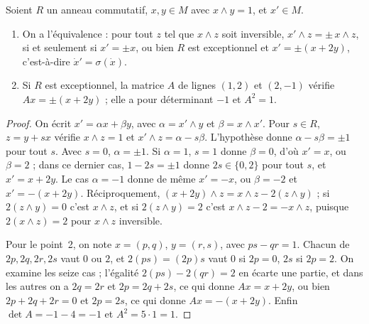 \begin{enonce}
Soient $R$ un anneau commutatif, $x, y \in M$ avec $x \wedge y = 1$, et $x' \in M$.
\begin{enumerate}
\item On a l'équivalence : pour tout $z$ tel que $x \wedge z$ soit inversible, $x' \wedge z = \pm\, x \wedge z$, si et seulement si $x' = \pm x$, ou bien $R$ est exceptionnel et $x' = \pm(x + 2y)$, c'est-à-dire $\dot x' = \sigma(\dot x)$.
\item Si $R$ est exceptionnel, la matrice $A$ de lignes $(1, 2)$ et $(2, -1)$ vérifie $Ax = \pm(x + 2y)$ ; elle a pour déterminant $-1$ et $A^2 = 1$.
\end{enumerate}
\end{enonce}

\begin{proof}
On écrit $x' = \alpha x + \beta y$, avec $\alpha = x' \wedge y$ et $\beta = x \wedge x'$. Pour $s \in R$, $z = y + sx$ vérifie $x \wedge z = 1$ et $x' \wedge z = \alpha - s\beta$. L'hypothèse donne $\alpha - s\beta = \pm 1$ pour tout $s$. Avec $s = 0$, $\alpha = \pm 1$. Si $\alpha = 1$, $s = 1$ donne $\beta = 0$, d'où $x' = x$, ou $\beta = 2$ ; dans ce dernier cas, $1 - 2s = \pm 1$ donne $2s \in \{0, 2\}$ pour tout $s$, et $x' = x + 2y$. Le cas $\alpha = -1$ donne de même $x' = -x$, ou $\beta = -2$ et $x' = -(x + 2y)$. Réciproquement, $(x + 2y) \wedge z = x \wedge z - 2(z \wedge y)$ ; si $2(z \wedge y) = 0$ c'est $x \wedge z$, et si $2(z \wedge y) = 2$ c'est $x \wedge z - 2 = -x \wedge z$, puisque $2(x \wedge z) = 2$ pour $x \wedge z$ inversible.

Pour le point~2, on note $x = (p, q)$, $y = (r, s)$, avec $ps - qr = 1$. Chacun de $2p, 2q, 2r, 2s$ vaut $0$ ou $2$, et $2(ps) = (2p)s$ vaut $0$ si $2p = 0$, $2s$ si $2p = 2$. On examine les seize cas ; l'égalité $2(ps) - 2(qr) = 2$ en écarte une partie, et dans les autres on a $2q = 2r$ et $2p = 2q + 2s$, ce qui donne $Ax = x + 2y$, ou bien $2p + 2q + 2r = 0$ et $2p = 2s$, ce qui donne $Ax = -(x + 2y)$. Enfin $\det A = -1 - 4 = -1$ et $A^2 = 5 \cdot 1 = 1$.
\end{proof}

